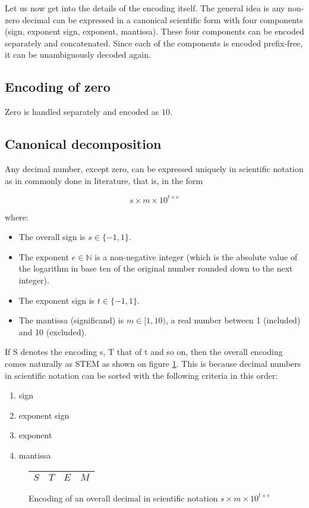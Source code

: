 \documentclass{acm_proc_article-sp}
\begin{document}
Let us now get into the details of the encoding itself. The general idea is any non-zero decimal can be expressed in a canonical scientific form with four components (sign, exponent sign, exponent, mantissa). These four components can be encoded separately and concatenated. Since each of the components is encoded prefix-free, it can be unambiguously decoded again.

\subsection{Encoding of zero}

Zero is handled separately and encoded as $10$.

\subsection{Canonical decomposition}

Any decimal number, except zero, can be expressed uniquely in scientific notation as in commonly done in literature, that is, in the form

$$s\times m \times10^{t\times e}$$

where:

\begin{itemize}
\item The overall sign is $s\in \{-1, 1\}$.
\item The exponent $e\in \mathbb{N}$ is a non-negative integer (which is the absolute value of the logarithm in base ten of the original number rounded down to the next integer).
\item The exponent sign is $t\in \{-1, 1\}$.
\item The mantissa (significand) is $m\in [1,10)$, a real number between 1 (included) and 10 (excluded).
\end{itemize}

If S denotes the encoding s, T that of t and so on, then the overall encoding comes naturally as STEM as shown on figure \ref{figure-overall-encoding}. This is because decimal numbers in scientific notation can be sorted with the following criteria in this order:
\begin{enumerate}
\item sign
\item exponent sign
\item exponent
\item mantissa
\end{enumerate}

\begin{figure}
\caption{Encoding of an overall decimal in scientific notation $s\times m \times10^{t\times e}$}
\label{figure-overall-encoding}
\center
\begin{tabular}{|l|l|l|l|}
\hline
$S$ & $T$ & $E$ & $M$ \\
\hline
\end{tabular}
\end{figure}
\end{document}
